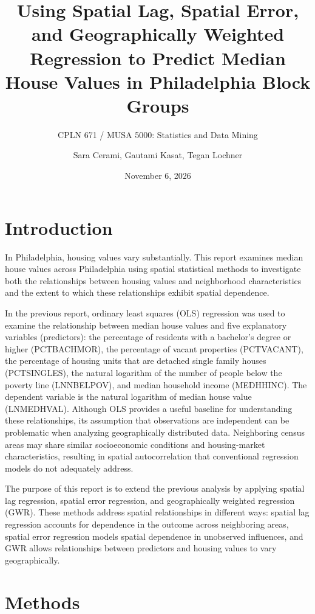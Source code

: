 \documentclass[
  12pt,
]{article}
\title{Using Spatial Lag, Spatial Error, and Geographically Weighted
Regression to Predict Median House Values in Philadelphia Block Groups}
\subtitle{CPLN 671 / MUSA 5000: Statistics and Data Mining}
\author{Sara Cerami, Gautami Kasat, Tegan Lochner}
\date{November 6, 2026}
\begin{document}
\maketitle

{
\hypersetup{linkcolor=blue}
\setcounter{tocdepth}{2}
\tableofcontents
}
\newpage

\section{Introduction}\label{introduction}

In Philadelphia, housing values vary substantially. This report examines
median house values across Philadelphia using spatial statistical
methods to investigate both the relationships between housing values and
neighborhood characteristics and the extent to which these relationships
exhibit spatial dependence.

In the previous report, ordinary least squares (OLS) regression was used
to examine the relationship between median house values and five
explanatory variables (predictors): the percentage of residents with a
bachelor's degree or higher (PCTBACHMOR), the percentage of vacant
properties (PCTVACANT), the percentage of housing units that are
detached single family houses (PCTSINGLES), the natural logarithm of the
number of people below the poverty line (LNNBELPOV), and median
household income (MEDHHINC). The dependent variable is the natural
logarithm of median house value (LNMEDHVAL). Although OLS provides a
useful baseline for understanding these relationships, its assumption
that observations are independent can be problematic when analyzing
geographically distributed data. Neighboring census areas may share
similar socioeconomic conditions and housing-market characteristics,
resulting in spatial autocorrelation that conventional regression models
do not adequately address.

The purpose of this report is to extend the previous analysis by
applying spatial lag regression, spatial error regression, and
geographically weighted regression (GWR). These methods address spatial
relationships in different ways: spatial lag regression accounts for
dependence in the outcome across neighboring areas, spatial error
regression models spatial dependence in unobserved influences, and GWR
allows relationships between predictors and housing values to vary
geographically.

\section{Methods}\label{methods}
\end{document}
